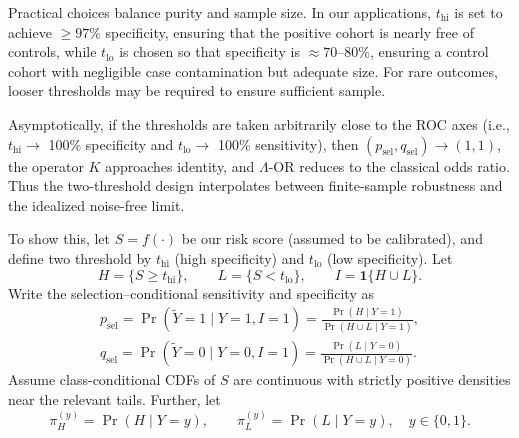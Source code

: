 \documentclass[pdflatex,sn-mathphys-num]{sn-jnl}%
\def\EQSP{3pt}
\newcommand{\cgather}[2][\EQSP]{\begingroup\setlength\abovedisplayskip{#1}\setlength\belowdisplayskip{#1}\begin{gather} #2 \end{gather}\endgroup\noindent}
\theoremstyle{thmstyleone}%
\theoremstyle{thmstyletwo}%
\theoremstyle{thmstylethree}%
\begin{document}
Practical choices balance purity and sample size. In our applications, 
$t_{\mathrm{hi}}$ is set to achieve $\geq 97\%$ specificity, ensuring that the 
positive cohort is nearly free of controls, while $t_{\mathrm{lo}}$ is chosen 
so that specificity is $\approx 70$--$80\%$, ensuring a control cohort with 
negligible case contamination but adequate size. For rare outcomes, looser 
thresholds may be required to ensure sufficient sample. 

Asymptotically, if the thresholds are taken arbitrarily close to the ROC axes 
(i.e., $t_{\mathrm{hi}} \to$ 100\% specificity and $t_{\mathrm{lo}} \to$ 100\% 
sensitivity), then $(p_{\text{sel}}, q_{\text{sel}}) \to (1,1)$, the operator 
$K$ approaches identity, and $\Lambda$-OR reduces to the classical odds ratio. 
Thus the two-threshold design interpolates between finite-sample robustness and the 
idealized noise-free limit.

To show this, let $S=f(\cdot)$ be our risk score (assumed to be  calibrated), and define two threshold by
$t_{\mathrm{hi}}$ (high specificity) and $t_{\mathrm{lo}}$ (low specificity). Let
\[
H=\{S\ge t_{\mathrm{hi}}\},\qquad L=\{S<t_{\mathrm{lo}}\},\qquad I=\mathbf{1}\{H\cup L\}.
\]
Write the selection–conditional sensitivity and specificity as
\cgather{
p_{\text{sel}}=\Pr(\tilde Y=1\mid Y=1,I=1)=\frac{\Pr(H\mid Y=1)}{\Pr(H\cup L\mid Y=1)},\\
q_{\text{sel}}=\Pr(\tilde Y=0\mid Y=0,I=1)=\frac{\Pr(L\mid Y=0)}{\Pr(H\cup L\mid Y=0)}.
}%
Assume class-conditional CDFs of $S$ are continuous with strictly positive densities near the relevant tails. Further, let
\[
\pi_H^{(y)}=\Pr(H\mid Y=y),\qquad \pi_L^{(y)}=\Pr(L\mid Y=y),\quad y\in\{0,1\}.
\]
\end{document}
